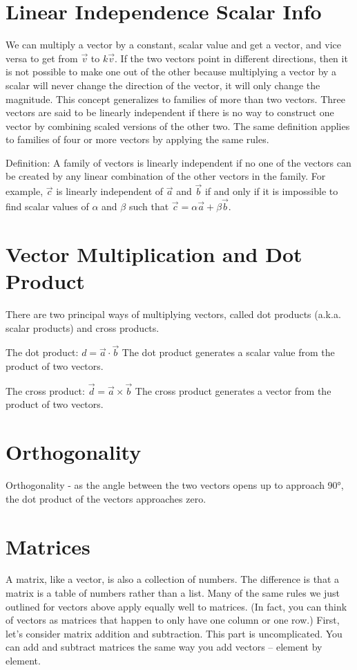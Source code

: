 \documentclass{article}
\begin{document}
\section{Linear Independence Scalar Info}
We can multiply a vector by a constant, scalar value and get a vector, and vice versa to get from $\vec{v}$ to $k\vec{v}$. If the two vectors point in different directions, then it is not possible to make one out of the other because multiplying a vector by a scalar will never change the direction of the vector, it will only change the magnitude. This concept generalizes to families of more than two vectors. Three vectors are said to be linearly independent if there is no way to construct one vector by combining scaled versions of the other two. The same definition applies to families of four or more vectors by applying the same rules.

Definition: A family of vectors is linearly independent if no one of the vectors can be created by any linear combination of the other vectors in the family. For example, $\vec{c}$ is linearly independent of $\vec{a}$ and $\vec{b}$ if and only if it is impossible to find scalar values of $\alpha$ and $\beta$ such that $\vec{c} = \alpha\vec{a} + \beta\vec{b}$.

\section{Vector Multiplication and Dot Product}
There are two principal ways of multiplying vectors, called dot products (a.k.a. scalar products) and cross products.

The dot product: $d = \vec{a} \cdot \vec{b}$
The dot product generates a scalar value from the product of two vectors.

The cross product: $\vec{d} = \vec{a} \times \vec{b}$
The cross product generates a vector from the product of two vectors.

\section{Orthogonality}
Orthogonality - as the angle between the two vectors opens up to approach 90°, the dot product of the vectors approaches zero.

\section{Matrices} 
A matrix, like a vector, is also a collection of numbers. The difference is that a matrix is a table of numbers rather than a list. Many of the same rules we just outlined for vectors above apply equally well to matrices. (In fact, you can think of vectors as matrices that happen to only have one column or one row.) First, let's consider matrix addition and subtraction. This part is uncomplicated. You can add and subtract matrices the same way you add vectors – element by element.
\end{document}
